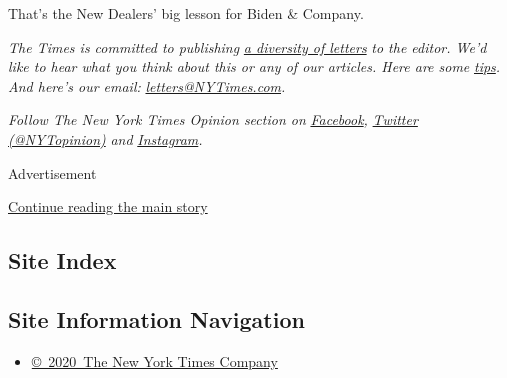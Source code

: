 That's the New Dealers' big lesson for Biden \& Company.

\emph{The Times is committed to publishing}
\href{https://www.nytimes3xbfgragh.onion/2019/01/31/opinion/letters/letters-to-editor-new-york-times-women.html}{\emph{a
diversity of letters}} \emph{to the editor. We'd like to hear what you
think about this or any of our articles. Here are some}
\href{https://help.nytimes3xbfgragh.onion/hc/en-us/articles/115014925288-How-to-submit-a-letter-to-the-editor}{\emph{tips}}\emph{.
And here's our email:}
\href{mailto:letters@NYTimes.com}{\emph{letters@NYTimes.com}}\emph{.}

\emph{Follow The New York Times Opinion section on}
\href{https://www.facebookcorewwwi.onion/nytopinion}{\emph{Facebook}}\emph{,}
\href{http://twitter.com/NYTOpinion}{\emph{Twitter (@NYTopinion)}}
\emph{and}
\href{https://www.instagram.com/nytopinion/}{\emph{Instagram}}\emph{.}

Advertisement

\protect\hyperlink{after-bottom}{Continue reading the main story}

\hypertarget{site-index}{%
\subsection{Site Index}\label{site-index}}

\hypertarget{site-information-navigation}{%
\subsection{Site Information
Navigation}\label{site-information-navigation}}

\begin{itemize}
\tightlist
\item
  \href{https://help.nytimes3xbfgragh.onion/hc/en-us/articles/115014792127-Copyright-notice}{©~2020~The
  New York Times Company}
\end{itemize}

